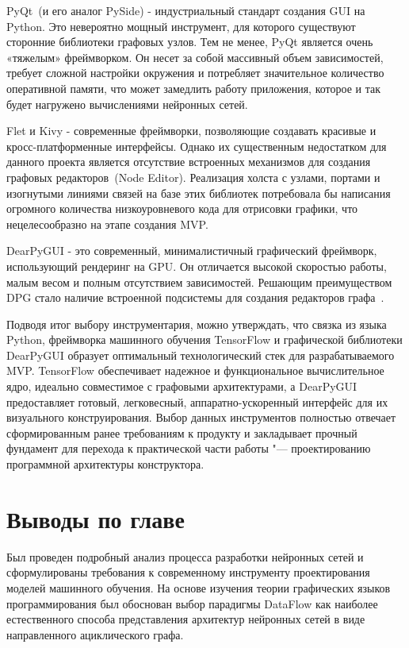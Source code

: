 \documentclass{report}
\begin{document}
\begin{enummarker}
\item PyQt~(и его аналог PySide) - индустриальный стандарт создания GUI на Python. Это невероятно мощный инструмент, для которого существуют сторонние библиотеки графовых узлов. Тем не менее, PyQt является очень «тяжелым» фреймворком. Он несет за собой массивный объем зависимостей, требует сложной настройки окружения и потребляет значительное количество оперативной памяти, что может замедлить работу приложения, которое и так будет нагружено вычислениями нейронных сетей.
\item Flet и Kivy - современные фреймворки, позволяющие создавать красивые и кросс-платформенные интерфейсы. Однако их существенным недостатком для данного проекта является отсутствие встроенных механизмов для создания графовых редакторов~(Node Editor). Реализация холста с узлами, портами и изогнутыми линиями связей на базе этих библиотек потребовала бы написания огромного количества низкоуровневого кода для отрисовки графики, что нецелесообразно на этапе создания MVP.
\item DearPyGUI - это современный, минималистичный графический фреймворк, использующий рендеринг на GPU. Он отличается высокой скоростью работы, малым весом и полным отсутствием зависимостей. Решающим преимуществом DPG стало наличие встроенной подсистемы для создания редакторов графа~\cite{bib_dearpygui}.
\end{enummarker}

Подводя итог выбору инструментария, можно утверждать, что связка из языка Python, фреймворка машинного обучения TensorFlow и графической библиотеки DearPyGUI образует оптимальный технологический стек для разрабатываемого MVP. TensorFlow обеспечивает надежное и функциональное вычислительное ядро, идеально совместимое с графовыми архитектурами, а DearPyGUI предоставляет готовый, легковесный, аппаратно-ускоренный интерфейс для их визуального конструирования. Выбор данных инструментов полностью отвечает сформированным ранее требованиям к продукту и закладывает прочный фундамент для перехода к практической части работы "--- проектированию программной архитектуры конструктора.


\section*{Выводы по главе}
Был проведен подробный анализ процесса разработки нейронных сетей и сформулированы требования к современному инструменту проектирования моделей машинного обучения. На основе изучения теории графических языков программирования был обоснован выбор парадигмы DataFlow как наиболее естественного способа представления архитектур нейронных сетей в виде направленного ациклического графа.
\end{document}

